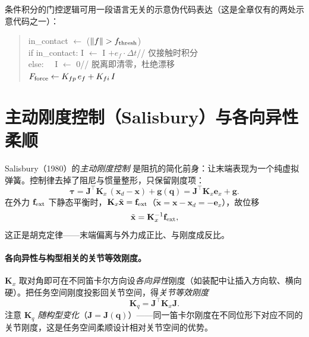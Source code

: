 条件积分的门控逻辑可用一段语言无关的示意伪代码表达（这是全章仅有的两处示意代码之一）：
\begin{quote}\small\ttfamily
in\_contact $\leftarrow$ ($\|f\|>f_{\rm thresh}$)\\
if in\_contact: \quad I $\leftarrow$ I $+ e_f \cdot \Delta t$\quad // 仅接触时积分\\
else: \qquad\qquad\ \, I $\leftarrow$ 0\qquad\qquad\quad // 脱离即清零，杜绝漂移\\
$F_{\rm force} \leftarrow K_{fp}\, e_f + K_{fi}\, I$
\end{quote}

\section{主动刚度控制（Salisbury）与各向异性柔顺}
\label{sec:fw-stiffness}

Salisbury（1980）的\emph{主动刚度控制}\cite{salisbury1980active} 是阻抗的简化前身：让末端表现为一个纯虚拟弹簧。控制律去掉了阻尼与惯量整形，只保留刚度项：
\begin{equation}
  \boldsymbol{\tau}=\mathbf{J}^\top\mathbf{K}_x\,(\mathbf{x}_d-\mathbf{x})+\mathbf{g}(\mathbf{q})
  =\mathbf{J}^\top\mathbf{K}_x\mathbf{e}_x+\mathbf{g}.
  \label{eq:fw-stiffness-law}
\end{equation}
在外力 $\mathbf{f}_{\rm ext}$ 下静态平衡时，$\mathbf{K}_x\tilde{\mathbf{x}}=\mathbf{f}_{\rm ext}$（$\tilde{\mathbf{x}}=\mathbf{x}-\mathbf{x}_d=-\mathbf{e}_x$），故位移
\begin{equation}
  \tilde{\mathbf{x}}=\mathbf{K}_x^{-1}\mathbf{f}_{\rm ext},
  \label{eq:fw-stiffness-spring}
\end{equation}
这正是胡克定律——末端偏离与外力成正比、与刚度成反比。

\paragraph{各向异性与构型相关的关节等效刚度。}
$\mathbf{K}_x$ 取对角即可在不同笛卡尔方向设\emph{各向异性}刚度（如装配中让插入方向软、横向硬）。把任务空间刚度投影回关节空间，得\emph{关节等效刚度}
\begin{equation}
  \mathbf{K}_q=\mathbf{J}^\top\mathbf{K}_x\mathbf{J}.
  \label{eq:fw-stiffness-joint}
\end{equation}
注意 $\mathbf{K}_q$ \emph{随构型变化}（$\mathbf{J}=\mathbf{J}(\mathbf{q})$）——同一笛卡尔刚度在不同位形下对应不同的关节刚度，这是任务空间柔顺设计相对关节空间的优势。

